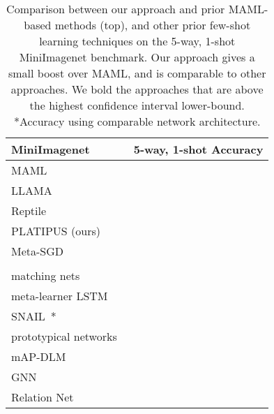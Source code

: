 \documentclass{article}
\begin{document}
\begin{table*}
\centering
\begin{tabular}{|l|c|}
\hline
MiniImagenet  &  5-way, 1-shot Accuracy \\
\hline
MAML~\cite{finn2017meta}  &   \\
\hline
LLAMA~\cite{grant2018recasting}  &   \\
\hline
Reptile~\cite{nichol2018reptile} &   \\
\hline
PLATIPUS (ours) &   \\
\hline
Meta-SGD~\cite{li2017meta} &   \\
\hline
& \vspace{-0.3cm} \\
\hline
matching nets~\cite{vinyals2016matching} &  \\
\hline
meta-learner LSTM~\cite{ravi2017optimization} &   \\
\hline
SNAIL~\cite{mishra2018a}* &   \\
\hline
prototypical networks~\cite{snell2017prototypical} &   \\
\hline
mAP-DLM~\cite{snell2017prototypical} &   \\
\hline
GNN~\cite{garcia2017few} &   \\
\hline
Relation Net~\cite{sung2017learning} &   \\
\hline
\end{tabular}
\vspace{-0.2cm}
\caption{Comparison between our approach and prior MAML-based methods (top), and other prior few-shot learning techniques on the 5-way, 1-shot MiniImagenet benchmark. Our approach gives a small boost over MAML, and is comparable to other approaches. We bold the approaches that are above the highest confidence interval lower-bound. *Accuracy using comparable network architecture.
\label{tbl:miniimagenet}
}
\end{table*} 
\end{document}
